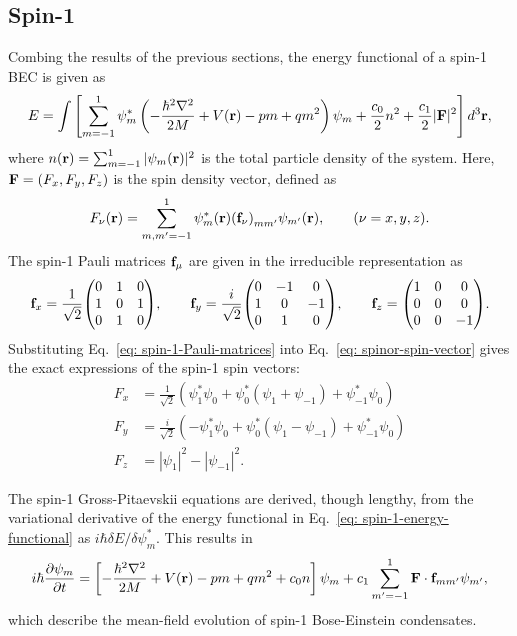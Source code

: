 \subsection{Spin-1}
Combing the results of the previous sections, the energy functional of a spin-1
BEC is given as~\cite{Kawaguchi2012}
\begin{equation}\label{eq: spin-1-energy-functional}
    E = \int \left[\sum_{m=-1}^1\psi_m^*\left(-\frac{\hbar^2\nabla^2}{2M}
    + V(\vb{r}) - pm + qm^2\right)\psi_m + \frac{c_0}{2}n^2
    + \frac{c_1}{2}|\vb{F}|^2\right] d^3\vb{r},
\end{equation}
where \(n(\vb{r}) = \sum_{m=-1}^{1}|\psi_m(\vb{r})|^2\) is the total particle
density of the system.
Here, \(\vb{F}=(F_x, F_y, F_z)\) is the spin density vector, defined as
\begin{equation}\label{eq: spinor-spin-vector}
    F_\nu(\vb{r}) = \sum_{m,m'=-1}^{1}\psi_m^*(\vb{r}){(\vb{f}_\nu)}_{mm'}
    \psi_{m'}(\vb{r}), \qquad (\nu=x, y, z).
\end{equation}
The spin-1 Pauli matrices \(\vb{f}_\mu\) are given in the irreducible
representation as
\begin{equation}\label{eq: spin-1-Pauli-matrices}
    \vb{f}_x = \frac{1}{\sqrt{2}}\mqty(0 & 1 & 0 \\ 1 & 0 & 1 \\ 0 & 1 & 0),
    \qquad
    \vb{f}_y = \frac{i}{\sqrt{2}}\mqty(0 & -1 & 0 \\ 1 & 0 & -1 \\ 0 & 1 & 0),
    \qquad
    \vb{f}_z = \mqty(1 & 0 & 0 \\ 0 & 0 & 0 \\ 0 & 0 & -1).
\end{equation}
Substituting Eq.~\eqref{eq: spin-1-Pauli-matrices} into
Eq.~\eqref{eq: spinor-spin-vector} gives the exact expressions of the spin-1
spin vectors:
\begin{align}\label{eq: spin-1-spin-vectors}
    F_x &= \frac{1}{\sqrt{2}} \left(\psi_1^*\psi_0 + \psi_0^*(\psi_1+\psi_{-1})
    + \psi_{-1}^*\psi_0\right)\\
    F_y &= \frac{i}{\sqrt{2}}\left(-\psi_1^*\psi_0 + \psi_0^*(\psi_1-\psi_{-1})
    +\psi_{-1}^*\psi_0\right) \\
    F_z &= |\psi_1|^2-|\psi_{-1}|^2.
\end{align}

The spin-1 Gross-Pitaevskii equations are derived, though lengthy, from the
variational derivative of the energy functional in
Eq.~\eqref{eq: spin-1-energy-functional} as \(i\hbar\delta E/\delta \psi_m^*\).
This results in
\begin{equation}\label{eq: spin-1-GPEs}
    i\hbar \pdv{\psi_m}{t} = \left[-\frac{\hbar^2\nabla^2}{2M} + V(\vb{r})
    - pm + qm^2 + c_0n\right]\psi_m 
    + c_1\sum_{m'=-1}^{1}\vb{F}\cdot \vb{f}_{mm'}\psi_{m'},
\end{equation}
which describe the mean-field evolution of spin-1 Bose-Einstein condensates.


